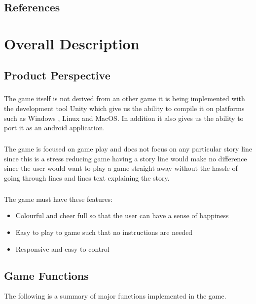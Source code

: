 \section{References}


\chapter{Overall Description}
\label{Overall Description}

\section{Product Perspective}
\paragraph{}The game itself is not derived from an other game it is being implemented with the development tool Unity which give us the ability to compile it on platforms such as Windows , Linux and MacOS. In addition it also gives us the ability to port it as an android application.

\paragraph{}The game is focused on game play and does not focus on any particular story line since this is a stress reducing game having a story line would make no difference since the user would want to play a game straight away without the hassle of going through lines and lines text explaining the story.

\paragraph{} The game must have these features:
\begin{itemize}
    \item Colourful and cheer full so that the user can have a sense of happiness 
    \item Easy to play to game such that no instructions are needed 
    \item Responsive and easy to control  
\end{itemize}
\section{Game Functions}
The following is a summary of major functions implemented in the game.
